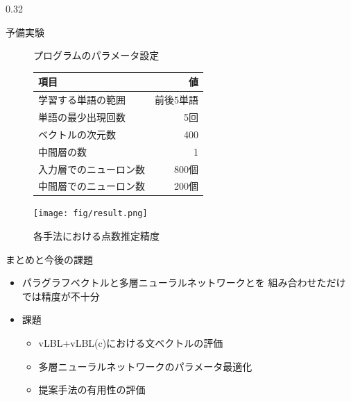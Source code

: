 \documentclass[8pt,unicode]{beamer}
\newcommand{\columnscale}{0.32}
\begin{document}
\begin{frame}{}
\begin{columns}[t]
\begin{column}{\columnscale\textwidth}
\begin{block}{予備実験}
    \vspace{-1em} %
    \begin{figure}
      \centering
      \begin{minipage}[t]{0.45\textwidth}
        \centering
        \small
        \caption{\small プログラムのパラメータ設定}
        \begin{tabular}{l | r}
          項目 & 値 \\
          \hline
          学習する単語の範囲 & 前後5単語 \\
          単語の最少出現回数 & 5回 \\
          ベクトルの次元数 & 400 \\
          中間層の数 & 1 \\
          入力層でのニューロン数 & 800個 \\
          中間層でのニューロン数 & 200個
        \end{tabular}
      \end{minipage}\hfill
      \begin{minipage}[t]{0.45\textwidth}
        \centering
        \vspace{0em}
        \texttt{[image: fig/result.png]}
        \caption{\small 各手法における点数推定精度}
      \end{minipage}
    \end{figure}
  \end{block} %

  \begin{block}{まとめと今後の課題}
    \begin{itemize}
      \item パラグラフベクトルと多層ニューラルネットワークとを
        組み合わせただけでは精度が不十分
      \item 課題
        \begin{itemize}
          \item vLBL+vLBL(c)における文ベクトルの評価
          \item 多層ニューラルネットワークのパラメータ最適化
          \item 提案手法の有用性の評価
        \end{itemize}
    \end{itemize}
  \end{block} %


\end{column}
\end{columns}
\end{frame}
\end{document}
